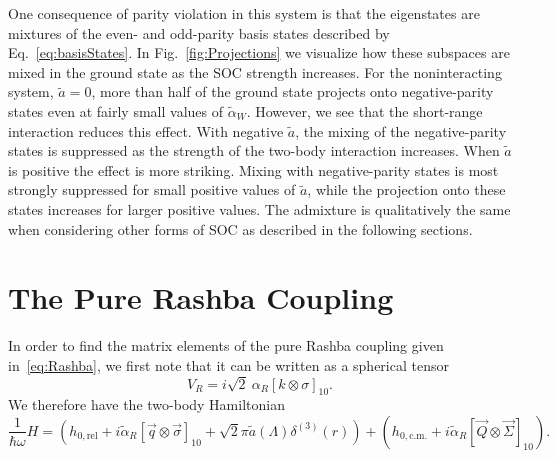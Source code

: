 One consequence of parity violation in this system is that the eigenstates are mixtures of the even- and odd-parity basis states described by Eq.~\eqref{eq:basisStates}. In Fig.~\ref{fig:Projections} we visualize how these subspaces are mixed in the ground state as the SOC strength increases. For the noninteracting system, $\tilde{a}=0$, more than half of the ground state projects onto negative-parity states even at fairly small values of $\tilde{\alpha}_W$. However, we see that the short-range interaction reduces this effect. With negative $\tilde{a}$, the mixing of the negative-parity states is suppressed as the strength of the two-body interaction increases. When $\tilde{a}$ is positive the effect is more striking. Mixing with negative-parity states is most strongly suppressed for small positive values of $\tilde{a}$, while the projection onto these states increases for larger positive values. The admixture is qualitatively the same when considering other forms of SOC as described in the following sections.

\section{\label{sec:Rashba}The Pure Rashba Coupling}

In order to find the matrix elements of the pure Rashba coupling given in~\eqref{eq:Rashba}, we first note that it can be written as a spherical tensor
\begin{equation}
V_{R}=i\sqrt{2}\:\alpha_R \left[ k \otimes \sigma \right]_{10}.
\end{equation}
We therefore have the two-body Hamiltonian
\begin{equation}\label{eq:RashbaHamiltonian}
\frac{1}{\hbar\omega}H=\left(h_{0,\text{rel}}+i \tilde{\alpha}_R  \left[ \vec{q} \otimes \vec{\sigma} \right]_{10} + \sqrt{2}\pi \tilde{a}(\Lambda) \delta^{(3)}(r)\right)+\left(h_{0,\text{c.m.}}+i \tilde{\alpha}_R [ \vec{Q}\otimes \vec{\Sigma} ]_{10} \right).
\end{equation}

